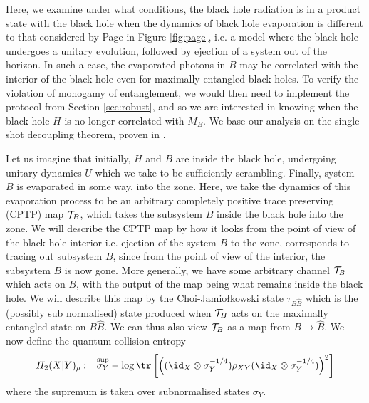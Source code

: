 \documentclass[12pt,a4paper]{article}
\begin{document}
Here, we examine under what conditions, the black hole radiation is in a product state with the black hole when the dynamics of black hole evaporation is different to 
that considered by Page in Figure \ref{fig:page}, i.e. a model where the black hole undergoes a unitary evolution, followed by ejection of a system out of the horizon.
In such a case, the evaporated photons in $B$ may be correlated with the interior of the black hole even for maximally entangled black holes. To verify the
violation of monogamy of entanglement, we would then need to implement the protocol from Section \ref{sec:robust}, and so we are interested in knowing 
when the black hole $H$ is no longer correlated with $M_B$. We base our analysis on the single-shot decoupling theorem, proven in \cite{dupuis2010one}.

Let us imagine that initially, $H$ and $B$ are inside the black hole, undergoing unitary dynamics $U$ which we take to be sufficiently scrambling. Finally, system $B$ is evaporated in some way, into the zone. Here, we take the dynamics of this evaporation process to be an arbitrary completely positive trace preserving (CPTP) map ${\cal T}_B$, which takes the subsystem $B$ inside the black hole into the zone.  We will describe the CPTP map by how it looks from the point of view of the black hole interior i.e. ejection of the system $B$ to the zone, corresponds to tracing out subsystem $B$, since from the point of view of the interior, the subsystem $B$ is now gone. More generally, we have some arbitrary channel ${\cal T}_B$ which acts
on $B$, with the output of the map being what remains inside the black hole. We will describe this map by the Choi-Jamio{\l}kowski state $\tau_{B{\hat B}}$ which is
the (possibly sub normalised) state produced when ${\cal T}_B$ acts on the maximally entangled state on $B{\hat B}$. 
We can thus also view ${\cal T}_B$ as a map from $B\rightarrow{\hat B}$.
We now define the quantum collision entropy
\begin{align}
H_2(X|Y)_{\rho}:=\overset{\sup}{\sigma_Y} -\log\tr\left[ \left((\id_X\otimes\sigma_Y^{-1/4})\rho_{XY}(\id_X\otimes\sigma_Y^{-1/4})\right)^2\right]
\end{align}
where the supremum is taken over subnormalised states $\sigma_Y$.
\end{document}
